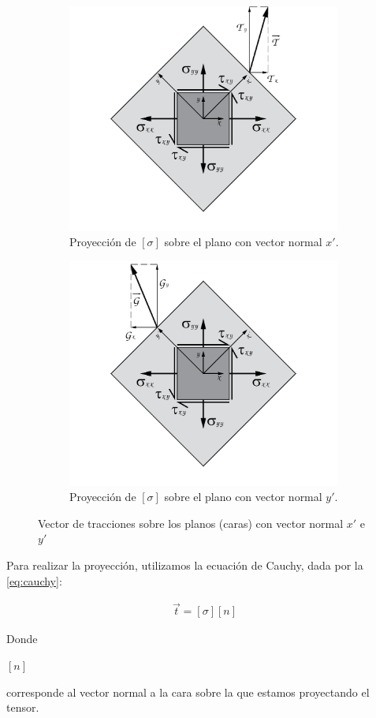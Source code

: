 \documentclass[12pt,letterpaper, twoside, openany]{article}
\begin{document}
\begin{figure}[H]
	\centering
	\begin{subfigure}[l]{0.45\textwidth}
		\includegraphics[width=9.0cm]{img/Proyecta_CaraXp.pdf}
		\caption{\small{Proyección de $\left[ \sigma \right]$ sobre el plano con vector normal $x'$.}}
		\label{fig:proycaraxp}
	\end{subfigure}
	\hspace{0.5 cm}
	\begin{subfigure}[r]{0.45\textwidth}
		\includegraphics[width=9.0cm]{img/Proyecta_CaraYp.pdf}
		\caption{\small{Proyección de $\left[ \sigma \right]$ sobre el plano con vector normal $y'$.}}
		\label{fig:proycarayp}
	\end{subfigure}
	\hspace{.5 cm}
	\caption{Vector de tracciones sobre los planos (caras) con vector normal $x'$ e $y'$ }
	\label{fig:proycara}
\end{figure}

Para realizar la proyección, utilizamos la ecuación de Cauchy, dada por la \cref{eq:cauchy}:
%
\begin{large}
	\begin{align}
		\overset{\rightarrow}{t}=\left[ \sigma \right] \left[n\right]
		\label{eq:cauchy}
	\end{align}
\end{large}
%
Donde \begin{large} $\left[ n \right]$\end{large} corresponde al vector normal a la cara sobre la que estamos proyectando el tensor. \\
\end{document}

